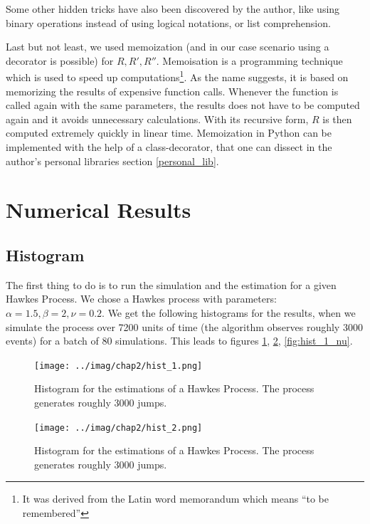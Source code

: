 \documentclass[11pt]{book}
\begin{document}
Some other hidden tricks have also been discovered by the author, like using binary operations instead of using logical notations, or list comprehension.

Last but not least, we used memoization (and in our case scenario using a decorator is possible) for $R,R',R''$. Memoisation is a programming technique which is used to speed up computations\footnote{It was derived from the Latin word memorandum which means “to be remembered”}. As the name suggests, it is based on memorizing the results of expensive function calls. Whenever the function is called again with the same parameters, the results does not have to be computed again and it avoids unnecessary calculations. With its recursive form, $R$ is then computed extremely quickly in linear time. Memoization in Python can be implemented with the help of a class-decorator, that one can dissect in the author's personal libraries section \ref{personal_lib}. 




\section{Numerical Results}



\subsection{Histogram}
The first thing to do is to run the simulation and the estimation for a given Hawkes Process. We chose a Hawkes process with parameters: $\alpha = 1.5, \beta = 2, \nu = 0.2$. We get the following histograms for the results, when we simulate the process over 7200 units of time (the algorithm observes roughly 3000 events) for a batch of 80 simulations. This leads to figures \ref{fig:hist_1_alpha}, \ref{fig:hist_1_beta}, \ref{fig:hist_1_nu}.

\begin{figure}
\centering
\texttt{[image: ../imag/chap2/hist\_1.png]}
\caption{Histogram for the estimations of a Hawkes Process. The process generates roughly 3000 jumps.}
\label{fig:hist_1_alpha}
\end{figure}


\begin{figure}
\centering
\texttt{[image: ../imag/chap2/hist\_2.png]}
\caption{Histogram for the estimations of a Hawkes Process. The process generates roughly 3000 jumps.}
\label{fig:hist_1_beta}
\end{figure}
\end{document}
